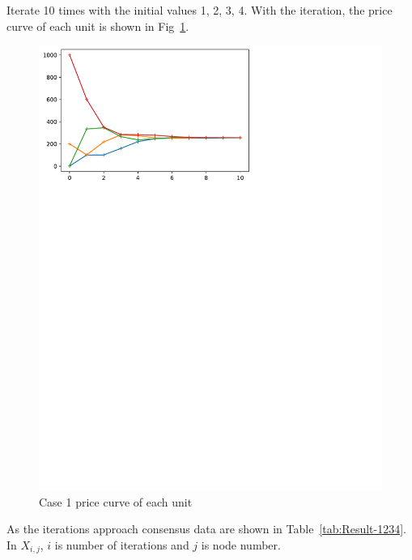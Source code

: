 \documentclass[conference]{IEEEtran}
\begin{document}
Iterate 10 times with the initial values 1, 2, 3, 4. With the iteration, the price curve of each unit is shown in Fig~\ref{fig:Result-1234}.

\begin{figure}[htbp]
    \centering
    \includegraphics[width=\columnwidth]{1234.pdf}
    \caption{Case 1 price curve of each unit}
    \label{fig:Result-1234}
\end{figure}

As the iterations approach consensus data are shown in Table~\ref{tab:Result-1234}. In $X_{i,j}$, $i$ is number of iterations and $j$ is node number.
\end{document}

